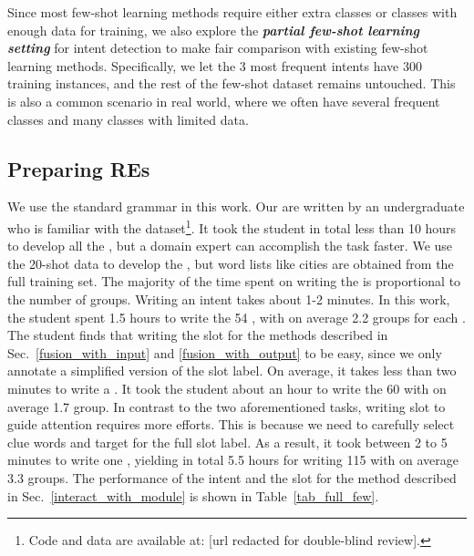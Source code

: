 Since most few-shot learning methods require either extra classes or classes with enough data for training, we also explore the
\textbf{\emph{partial few-shot learning setting}} for intent detection to make fair comparison with existing few-shot learning methods.
Specifically, we let the 3 most frequent intents have 300 training instances, and the rest of the few-shot dataset remains untouched.
This is also a common scenario in real world, where we often have several frequent classes and many classes with limited data.

\subsection{Preparing REs}
\label{re_in_exp} We use the standard \RE grammar in this work. Our \REs are written by an undergraduate who is
familiar with the dataset\footnote{Code and data are available at: [url redacted for double-blind review].}.  It took the student in total
less than 10 hours to develop all the \REs, but a domain expert can accomplish the task faster. We use the 20-shot data to develop the
\REs, but word lists like cities are obtained from the full training set. The majority of the time spent on writing the \REs is
proportional to the number of \RE groups. Writing an intent \RE takes about 1-2 minutes. In this work, the student spent 1.5 hours to write
the 54 \REs, with on average 2.2 \RE groups for each \RE. The student finds that writing the slot \RE for the methods described in
Sec.~\ref{fusion_with_input} and \ref{fusion_with_output} to be easy, since we only annotate a simplified version of the slot label. On
average, it takes less than two minutes to write a \RE. It took the student about an hour to write the 60 \REs with on average 1.7 \RE
group. In contrast to the two aforementioned tasks, writing slot \REs to guide attention requires more efforts. This is because we
need to carefully select clue words and target for the full slot label. As a result, it took between 2 to 5 minutes to write one \RE,
yielding in total 5.5 hours for writing 115 \REs with on average 3.3 \RE groups. The performance of the intent \REs and the slot \REs for
the method described in Sec.~\ref{interact_with_module} is shown in Table~\ref{tab_full_few}.


